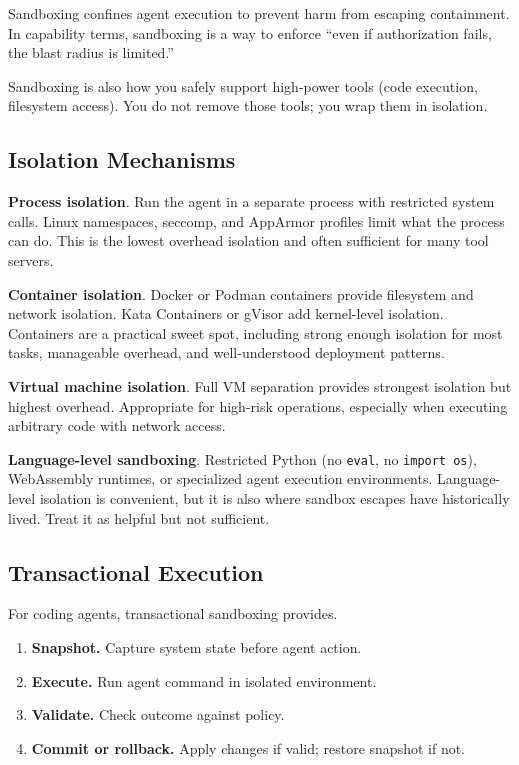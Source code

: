 Sandboxing confines agent execution to prevent harm from escaping containment. In capability terms, sandboxing is a way to enforce ``even if authorization fails, the blast radius is limited.''

Sandboxing is also how you safely support high-power tools (code execution, filesystem access). You do not remove those tools; you wrap them in isolation.

\subsection{Isolation Mechanisms}

\textbf{Process isolation}. Run the agent in a separate process with restricted system calls. Linux namespaces, seccomp, and AppArmor profiles limit what the process can do. This is the lowest overhead isolation and often sufficient for many tool servers.

\textbf{Container isolation}. Docker or Podman containers provide filesystem and network isolation. Kata Containers or gVisor add kernel-level isolation. Containers are a practical sweet spot, including strong enough isolation for most tasks, manageable overhead, and well-understood deployment patterns.

\textbf{Virtual machine isolation}. Full VM separation provides strongest isolation but highest overhead. Appropriate for high-risk operations, especially when executing arbitrary code with network access.

\textbf{Language-level sandboxing}. Restricted Python (no \texttt{eval}, no \texttt{import os}), WebAssembly runtimes, or specialized agent execution environments. Language-level isolation is convenient, but it is also where sandbox escapes have historically lived. Treat it as helpful but not sufficient.

\subsection{Transactional Execution}

For coding agents, transactional sandboxing \cite{sandbox2025} provides.

\begin{enumerate}
\item \textbf{Snapshot.} Capture system state before agent action.
\item \textbf{Execute.} Run agent command in isolated environment.
\item \textbf{Validate.} Check outcome against policy.
\item \textbf{Commit or rollback.} Apply changes if valid; restore snapshot if not.
\end{enumerate}

